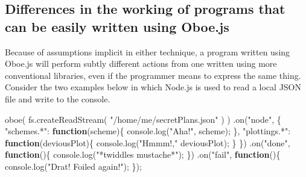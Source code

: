\documentclass[12pt, ]{article}
\newenvironment{Shaded}{}{}
\newcommand{\KeywordTok}[1]{\textcolor[rgb]{0.00,0.44,0.13}{\textbf{{#1}}}}
\newcommand{\StringTok}[1]{\textcolor[rgb]{0.25,0.44,0.63}{{#1}}}
\newcommand{\OtherTok}[1]{\textcolor[rgb]{0.00,0.44,0.13}{{#1}}}
\newcommand{\FunctionTok}[1]{\textcolor[rgb]{0.02,0.16,0.49}{{#1}}}
\newcommand{\NormalTok}[1]{{#1}}
\begin{document}
\subsection{Differences in the working of programs that can be easily
written using
Oboe.js}\label{differences-in-the-working-of-programs-that-can-be-easily-written-using-oboe.js}

Because of assumptions implicit in either technique, a program written
using Oboe.js will perform subtly different actions from one written
using more conventional libraries, even if the programmer means to
express the same thing. Consider the two examples below in which Node.js
is used to read a local JSON file and write to the console.

\begin{Shaded}
\begin{Highlighting}[]
\FunctionTok{oboe}\NormalTok{( }\OtherTok{fs}\NormalTok{.}\FunctionTok{createReadStream}\NormalTok{( }\StringTok{"/home/me/secretPlans.json"} \NormalTok{) )}
   \NormalTok{.}\FunctionTok{on}\NormalTok{(}\StringTok{"node"}\NormalTok{, \{}
      \StringTok{"schemes.*"}\NormalTok{: }\KeywordTok{function}\NormalTok{(scheme)\{}
         \OtherTok{console}\NormalTok{.}\FunctionTok{log}\NormalTok{(}\StringTok{"Aha!"}\NormalTok{, scheme);}
      \NormalTok{\},}
      \StringTok{"plottings.*"}\NormalTok{: }\KeywordTok{function}\NormalTok{(deviousPlot)\{}
         \OtherTok{console}\NormalTok{.}\FunctionTok{log}\NormalTok{(}\StringTok{"Hmmm!,"} \NormalTok{deviousPlot);}
      \NormalTok{\}   }
   \NormalTok{\})}
   \NormalTok{.}\FunctionTok{on}\NormalTok{(}\StringTok{"done"}\NormalTok{, }\KeywordTok{function}\NormalTok{()\{}
      \OtherTok{console}\NormalTok{.}\FunctionTok{log}\NormalTok{(}\StringTok{"*twiddles mustache*"}\NormalTok{);}
   \NormalTok{\})}
   \NormalTok{.}\FunctionTok{on}\NormalTok{(}\StringTok{"fail"}\NormalTok{, }\KeywordTok{function}\NormalTok{()\{}
      \OtherTok{console}\NormalTok{.}\FunctionTok{log}\NormalTok{(}\StringTok{"Drat! Foiled again!"}\NormalTok{);   }
   \NormalTok{\});}
\end{Highlighting}
\end{Shaded}
\end{document}
